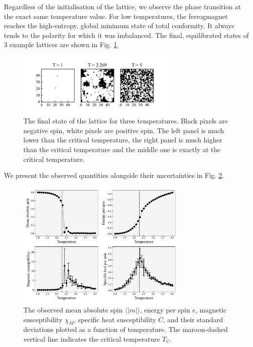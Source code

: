 \documentclass{IAYCPro}
\begin{document}
Regardless of the initialisation of the lattice, we observe the phase transition at the exact same temperature value. For low temperatures, the ferrogmagnet reaches the high-entropy, global minimum state of total conformity. It always tends to the polarity for which it was imbalanced. The final, equilibrated states of 3 example lattices are shown in Fig. \ref{fig:grids}.

\begin{figure}[H]
    \centering
    \includegraphics[width=0.7\textwidth]{figs/3Grids.pdf}
    \caption{The final state of the lattice for three temperatures. Black pixels are negative spin, white pixels are positive spin. The left panel is much lower than the critical temperature, the right panel is much higher than the critical temperature and the middle one is exactly at the critical temperature. }
    \label{fig:grids}
\end{figure}

\raggedbottom
\newpage

We present the observed quantities alongside their uncertainties in Fig. \ref{fig:fiducial}.

\begin{figure}[H]
    \centering
    \includegraphics[width=0.75\textwidth]{figs/main_result.pdf}
    \caption{The observed mean absolute spin $\langle | m | \rangle$, energy per spin $e$, magnetic susceptibility $\chi_M$, specific heat susceptibility $C$, and their standard deviations plotted as a function of temperature. The maroon-dashed vertical line indicates the critical temperature $T_\mathrm{C}$.}
    \label{fig:fiducial}
\end{figure}
\end{document}
